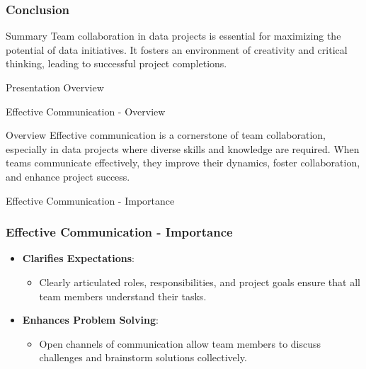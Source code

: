 \documentclass[aspectratio=169]{beamer}
\begin{document}
\begin{frame}[fragile]
  \frametitle{Conclusion}
  \begin{block}{Summary}
    Team collaboration in data projects is essential for maximizing the potential of data initiatives. It fosters an environment of creativity and critical thinking, leading to successful project completions.
  \end{block}
\end{frame}

\begin{frame}[fragile]{Presentation Overview}
  \tableofcontents[hideallsubsections]
\end{frame}

\begin{frame}[fragile]{Effective Communication - Overview}
    \begin{block}{Overview}
        Effective communication is a cornerstone of team collaboration, especially in data projects where diverse skills and knowledge are required. When teams communicate effectively, they improve their dynamics, foster collaboration, and enhance project success.
    \end{block}
\end{frame}

\begin{frame}[fragile]{Effective Communication - Importance}
    \frametitle{Effective Communication - Importance}
    \begin{itemize}
        \item \textbf{Clarifies Expectations}:
            \begin{itemize}
                \item Clearly articulated roles, responsibilities, and project goals ensure that all team members understand their tasks.
            \end{itemize}
        \item \textbf{Enhances Problem Solving}:
            \begin{itemize}
                \item Open channels of communication allow team members to discuss challenges and brainstorm solutions collectively.
            \end{itemize}
    \end{itemize}
\end{frame}
\end{document}
